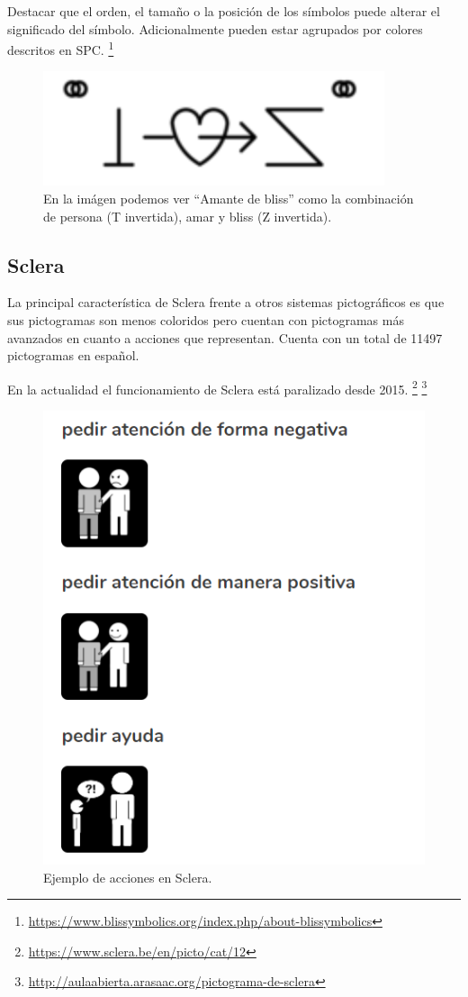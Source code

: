  Destacar que el orden, el tamaño o la posición de los símbolos puede alterar el significado del símbolo. Adicionalmente pueden estar agrupados por colores descritos en SPC.
\footnote{\url{https://www.blissymbolics.org/index.php/about-blissymbolics}}

\begin{figure}[h!]
	\centering
	\includegraphics[width=0.3\linewidth]{Imagenes/Bitmap/Blissymbolics}
	\caption[Ejemplo Blissymbolics]{En la imágen podemos ver “Amante de bliss” como la combinación de persona (T invertida), amar y bliss (Z invertida).}
	\label{fig:blissymbolics}
\end{figure}


\subsection{Sclera}
La principal característica de Sclera frente a otros sistemas pictográficos es que sus pictogramas son menos coloridos pero cuentan con pictogramas más avanzados en cuanto a acciones que representan. Cuenta con un total de 11497 pictogramas en español.

En la actualidad el funcionamiento de Sclera está paralizado desde 2015.
\footnote{\url{https://www.sclera.be/en/picto/cat/12}}
\footnote{\url{http://aulaabierta.arasaac.org/pictograma-de-sclera}}

\begin{figure}[h!]
	\centering
	\includegraphics[scale=0.34]{Imagenes/Bitmap/Sclera}
	\caption{Ejemplo de acciones en Sclera.}
	\label{fig:sclera}
\end{figure}

